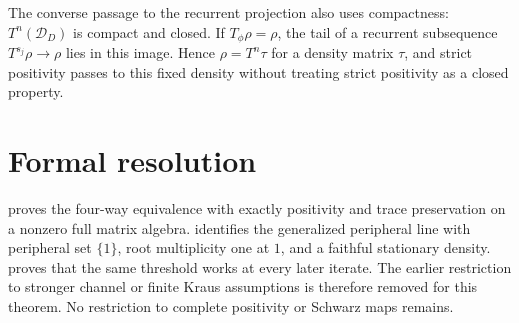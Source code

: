 \documentclass[11pt]{article}
\begin{document}
The converse passage to the recurrent projection also uses compactness:
$T^n(\mathcal D_D)$ is compact and closed. If $T_\phi\rho=\rho$, the tail
of a recurrent subsequence $T^{s_j}\rho\to\rho$ lies in this image. Hence
$\rho=T^n\tau$ for a density matrix $\tau$, and strict positivity passes to
this fixed density without treating strict positivity as a closed property.

\section{Formal resolution}

 proves the four-way equivalence
with exactly positivity and trace preservation on a nonzero full matrix
algebra. 
identifies the generalized peripheral line with peripheral set $\{1\}$,
root multiplicity one at $1$, and a faithful stationary density.
 proves
that the same threshold works at every later iterate. The earlier restriction
to stronger channel or finite Kraus assumptions is therefore removed for
this theorem. No restriction to complete positivity or Schwarz maps remains.



\end{document}
